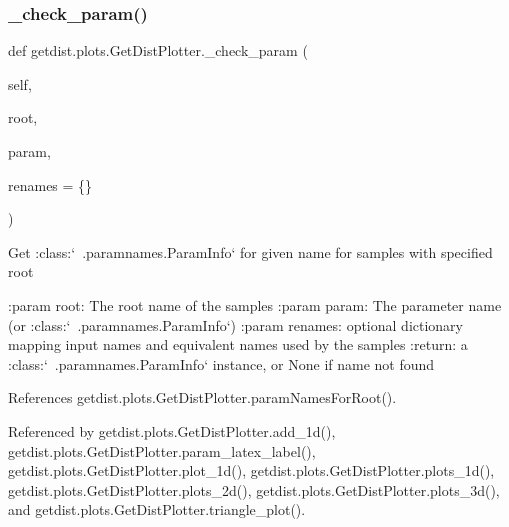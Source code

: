 \subsubsection{\texorpdfstring{\+\_\+check\+\_\+param()}{\_check\_param()}}
{\footnotesize\ttfamily def getdist.\+plots.\+Get\+Dist\+Plotter.\+\_\+check\+\_\+param (\begin{DoxyParamCaption}\item[{}]{self,  }\item[{}]{root,  }\item[{}]{param,  }\item[{}]{renames = {\ttfamily \{\}} }\end{DoxyParamCaption})\hspace{0.3cm}{\ttfamily [private]}}

\begin{DoxyVerb}Get :class:`~.paramnames.ParamInfo` for given name for samples with specified root

:param root: The root name of the samples
:param param: The parameter name (or :class:`~.paramnames.ParamInfo`)
:param renames: optional dictionary mapping input names and equivalent names used by the samples
:return: a :class:`~.paramnames.ParamInfo` instance, or None if name not found
\end{DoxyVerb}
 

References getdist.\+plots.\+Get\+Dist\+Plotter.\+param\+Names\+For\+Root().



Referenced by getdist.\+plots.\+Get\+Dist\+Plotter.\+add\+\_\+1d(), getdist.\+plots.\+Get\+Dist\+Plotter.\+param\+\_\+latex\+\_\+label(), getdist.\+plots.\+Get\+Dist\+Plotter.\+plot\+\_\+1d(), getdist.\+plots.\+Get\+Dist\+Plotter.\+plots\+\_\+1d(), getdist.\+plots.\+Get\+Dist\+Plotter.\+plots\+\_\+2d(), getdist.\+plots.\+Get\+Dist\+Plotter.\+plots\+\_\+3d(), and getdist.\+plots.\+Get\+Dist\+Plotter.\+triangle\+\_\+plot().

